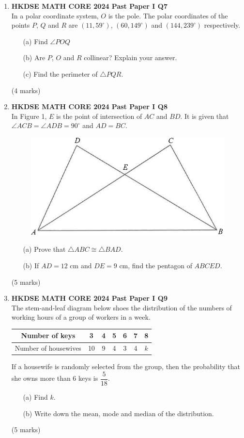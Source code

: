\documentclass[12pt]{article}
\begin{document}
\begin{enumerate}
	\item \textbf{HKDSE MATH CORE 2024 Past Paper I Q7}\\
    In a polar coordinate system, $O$ is the pole. The polar coordinates of the points $P$, $Q$ and $R$ are $(11, 59^\circ)$, $(60, 149^\circ)$ and $(144, 239^\circ)$ respectively.
	\begin{enumerate}
		\item[(a)] Find $\angle POQ$
		\item[(b)] Are $P$, $O$ and $R$ collinear? Explain your answer.
		\item[(c)] Find the perimeter of $\triangle PQR$.
	\end{enumerate}
	(4 marks)
	
	\item \textbf{HKDSE MATH CORE 2024 Past Paper I Q8}\\
    In Figure 1, $E$ is the point of intersection of $AC$ and $BD$. It is given that $\angle ACB = \angle ADB = 90^\circ$ and $AD = BC$.
	\begin{figure}[H]
		\centering
		\includegraphics[width = .5\linewidth]{2024Figure1.1}
	\end{figure}
	\begin{enumerate}
		\item[(a)] Prove that $\triangle ABC \cong \triangle BAD$.
		\item[(b)] If $AD = 12$ cm and $DE = 9$ cm, find the pentagon of $ABCED$.
	\end{enumerate}
	(5 marks)

	\item \textbf{HKDSE MATH CORE 2024 Past Paper I Q9}\\
	The stem-and-leaf diagram below shoes the distribution of the numbers of working hours of a group of workers in a week.
	\begin{table}[htbp]
		\centering
        \begin{tabular}{|c|c|c|c|c|c|c|}
			\hline
			Number of keys & 3 & 4 & 5 & 6 & 7 & 8 \\ \hline
			Number of housewives & 10 & 9 & 4 & 3 & 4 & $k$
			\\
			\hline
			\end{tabular}
		\label{tab:addlabel}
	\end{table}
    If a housewife is randomly selected from the group, then the probability that she owns more than 6 keys is $\dfrac{5}{18}$.
	\begin{enumerate}
		\item[(a)] Find $k$.
		\item[(b)] Write down the mean, mode and median of the distribution.
	\end{enumerate}
	(5 marks)


\end{enumerate}
\end{document}
